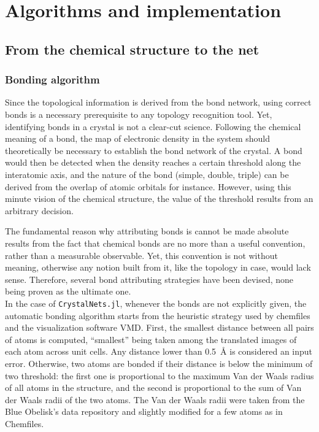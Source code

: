 \documentclass[main.tex]{subfiles}
\begin{document}
\section{Algorithms and implementation}

\subsection{From the chemical structure to the net}

\subsubsection{Bonding algorithm}
\label{bondingalgorithm}

Since the topological information is derived from the bond network, using correct bonds is a necessary prerequisite to any topology recognition tool. Yet, identifying bonds in a crystal is not a clear-cut science. %
Following the chemical meaning of a bond, the map of electronic density in the system should theoretically be necessary to establish the bond network of the crystal. A bond would then be detected when the density reaches a certain threshold along the interatomic axis, and the nature of the bond (simple, double, triple) can be derived from the overlap of atomic orbitals for instance. However, using this minute vision of the chemical structure, the value of the threshold results from an arbitrary decision.

The fundamental reason why attributing bonds is cannot be made absolute results from the fact that chemical bonds are no more than a useful convention, rather than a measurable observable. Yet, this convention is not without meaning, otherwise any notion built from it, like the topology in case, would lack sense. Therefore, several bond attributing strategies have been devised, none being proven as the ultimate one. %
\\

In the case of \texttt{CrystalNets.jl}, whenever the bonds are not explicitly given, the automatic bonding algorithm starts from the heuristic strategy used by chemfiles and the visualization software VMD\autocite{VMD}. First, the smallest distance between all pairs of atoms is computed, ``smallest'' being taken among the translated images of each atom across unit cells. Any distance lower than \qty{0.5}{\angstrom} is considered an input error. Otherwise, two atoms are bonded if their distance is below the minimum of two threshold: the first one is proportional to the maximum Van der Waals radius of all atoms in the structure, and the second is proportional to the sum of Van der Waals radii of the two atoms. The Van der Waals radii were taken from the Blue Obelisk's data repository and slightly modified for a few atoms as in Chemfiles.
\end{document}
